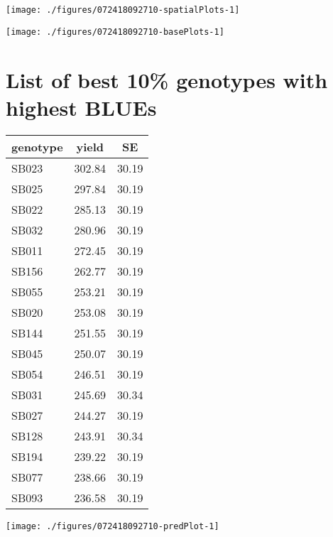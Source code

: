 \documentclass[a4paper,11pt]{article}\usepackage[]{graphicx}\usepackage[]{color}
\newenvironment{knitrout}{}{} %
\begin{document}
\texttt{[image: ./figures/072418092710-spatialPlots-1]} 

\begin{knitrout}
\color{fgcolor}
\texttt{[image: ./figures/072418092710-basePlots-1]} 

\end{knitrout}
\newpage

\section{List of best 10\% genotypes with
highest BLUEs}

\begin{multicols*}{2}
\begin{tabular}{lcc}
  \hline
genotype & yield & SE \\ 
  \hline
SB023 & 302.84 & 30.19 \\ 
  SB025 & 297.84 & 30.19 \\ 
  SB022 & 285.13 & 30.19 \\ 
  SB032 & 280.96 & 30.19 \\ 
  SB011 & 272.45 & 30.19 \\ 
  SB156 & 262.77 & 30.19 \\ 
  SB055 & 253.21 & 30.19 \\ 
  SB020 & 253.08 & 30.19 \\ 
  SB144 & 251.55 & 30.19 \\ 
  SB045 & 250.07 & 30.19 \\ 
  SB054 & 246.51 & 30.19 \\ 
  SB031 & 245.69 & 30.34 \\ 
  SB027 & 244.27 & 30.19 \\ 
  SB128 & 243.91 & 30.34 \\ 
  SB194 & 239.22 & 30.19 \\ 
  SB077 & 238.66 & 30.19 \\ 
  SB093 & 236.58 & 30.19 \\ 
   \hline
\end{tabular}

\columnbreak
\begin{knitrout}
\color{fgcolor}
\texttt{[image: ./figures/072418092710-predPlot-1]} 

\end{knitrout}
\end{multicols*}
\end{document}
